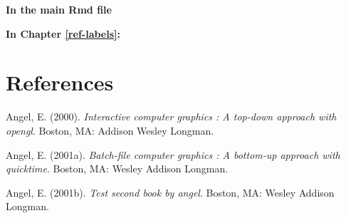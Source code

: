 \documentclass[12pt,twoside]{dukestatscithesis}
\theoremstyle{definition}
\theoremstyle{definition}
\theoremstyle{definition}
\theoremstyle{remark}
\begin{document}
\textbf{In the main Rmd file}

\textbf{In Chapter \ref{ref-labels}:}

\backmatter

\chapter*{References}\label{references}


\noindent

\setlength{\parindent}{-0.20in} \setlength{\leftskip}{0.20in}
\setlength{\parskip}{8pt}

\hypertarget{refs}{}
\hypertarget{ref-angel2000}{}
Angel, E. (2000). \emph{Interactive computer graphics : A top-down
approach with opengl}. Boston, MA: Addison Wesley Longman.

\hypertarget{ref-angel2001}{}
Angel, E. (2001a). \emph{Batch-file computer graphics : A bottom-up
approach with quicktime}. Boston, MA: Wesley Addison Longman.

\hypertarget{ref-angel2002a}{}
Angel, E. (2001b). \emph{Test second book by angel}. Boston, MA: Wesley
Addison Longman.


\end{document}
